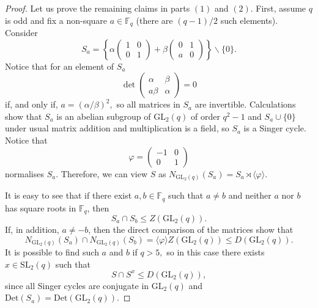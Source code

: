 \documentclass[a4paper,reqno,11pt]{amsart}
\theoremstyle{definition}
\theoremstyle{remark}
\numberwithin{equation}{section}
\newcommand{\Det}{\mathrm{Det}}
\newcommand{\SL}{{\mathrm{SL}}}
\newcommand{\GL}{{\mathrm{GL}}}
\begin{document}
\begin{proof}
 Let us prove the remaining claims in parts $(1)$ and $(2)$.
 First, assume $q$ is odd and fix a non-square $a \in \mathbb{F}_q$ (there are $(q-1)/2$ such elements). Consider 
\begin{equation}\label{thesin}
 S_a= \left\{
\alpha \begin{pmatrix}
1    & 0  \\
      0    &   1       
\end{pmatrix} + 
\beta \begin{pmatrix}
0    & 1  \\
a    &  0       
\end{pmatrix}
\right\} \backslash \{0\}.
\end{equation}
 Notice that for an element of $S_a$
$$\det \begin{pmatrix}
\alpha    & \beta  \\
    a  \beta    & \alpha       
\end{pmatrix} =0$$ if, and only if, $a=(\alpha/ \beta)^2,$ so all matrices in $S_a$ are invertible. 
 Calculations show that $S_a$ is an abelian subgroup of $\GL_2(q)$ of order $q^2-1$ and $S_a \cup \{0\}$ under usual matrix addition and multiplication is a field, so $S_a$ is a Singer cycle. Notice that 
$$\varphi = \begin{pmatrix}
-1    & 0  \\
0    &  1       
\end{pmatrix}$$
normalises $S_a.$ Therefore, we can view $S$ as   $N_{\GL_2(q)}(S_a)=S_a \rtimes \langle \varphi \rangle$. 

 It is easy to see that if there exist $a, b \in \mathbb{F}_q$ such that $a \ne b$
and neither $a$ nor $b$ has square roots in $\mathbb{F}_q$, then $$S_a \cap S_b \le Z(\GL_2(q)).$$ 
If, in addition, $a \ne -b$, then the direct comparison of the matrices show that 
\begin{equation}
\label{2sindiagodd}
 N_{\GL_2(q)}(S_a) \cap N_{\GL_2(q)}(S_b) =\langle \varphi \rangle Z(\GL_2(q)) \le D(\GL_2(q)).
\end{equation} 
It is possible to find such $a$ and $b$ if $q>5,$ so in this case there exists $x \in \SL_2(q)$ such that $$S \cap S^x \le D(\GL_2(q)),$$ since all Singer cycles are conjugate in $\GL_2(q)$ and $\Det(S_a)=\Det(\GL_2(q)).$


\end{proof}
\end{document}

